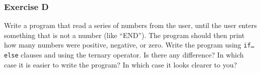 \subsubsection*{Exercise D}

Write a program that read a series of numbers from the user, until the
user enters something that is not a number (like ``END''). The program
should then print how many numbers were positive, negative, or
zero. Write the program using \texttt{if\ldots else} clauses and using
the ternary operator. Is there any difference? In which case it is
easier to write the program? In which case it looks clearer to you? 



